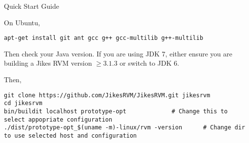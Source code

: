 \begin{chapter}{Quick Start Guide}
\label{cha:quickstartguide}

On Ubuntu,

\begin{lstlisting}
apt-get install git ant gcc g++ gcc-multilib g++-multilib
\end{lstlisting}

Then check your Java version.  If you are using JDK 7, either ensure you are building a Jikes RVM version $\geq 3.1.3$ or switch to JDK 6.

Then, 
\begin{lstlisting}
git clone https://github.com/JikesRVM/JikesRVM.git jikesrvm
cd jikesrvm
bin/buildit localhost prototype-opt             # Change this to select appopriate configuration
./dist/prototype-opt_$(uname -m)-linux/rvm -version      # Change dir to use selected host and configuration
\end{lstlisting}

\end{chapter}
